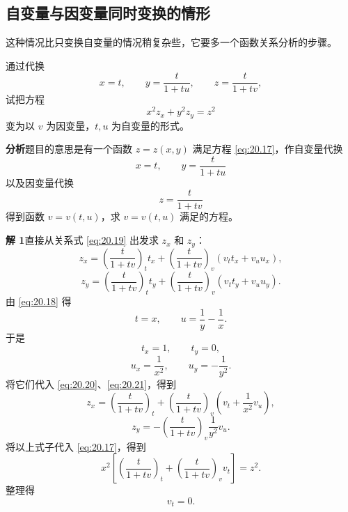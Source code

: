 \subsection{自变量与因变量同时变换的情形}

这种情况比只变换自变量的情况稍复杂些，它要多一个函数关系分析的步骤。

\begin{xexample}[20.3.3]
通过代换
\[
  x=t,\qquad y=\frac{t}{1+tu},\qquad z=\frac{t}{1+tv},
\]
试把方程
\begin{equation}
  x^2z_x+y^2z_y=z^2
  \tag{20.17}
  \label{eq:20.17}
\end{equation}
变为以 $v$ 为因变量，$t,u$ 为自变量的形式。
\end{xexample}
\begin{xsolution}
\textbf{分析}\quad 题目的意思是有一个函数 $z=z(x,y)$ 满足方程 \eqref{eq:20.17}，作自变量代换
\begin{equation}
  x=t,\qquad y=\frac{t}{1+tu}
  \tag{20.18}
  \label{eq:20.18}
\end{equation}
以及因变量代换
\begin{equation}
  z=\frac{t}{1+tv}
  \tag{20.19}
  \label{eq:20.19}
\end{equation}
得到函数 $v=v(t,u)$，求 $v=v(t,u)$ 满足的方程。

\textbf{解 1}\quad 直接从关系式 \eqref{eq:20.19} 出发求 $z_x$ 和 $z_y$：
\begin{equation}
  z_x=\left(\frac{t}{1+tv}\right)_t t_x
  +\left(\frac{t}{1+tv}\right)_v(v_tt_x+v_uu_x),
  \tag{20.20}
  \label{eq:20.20}
\end{equation}
\begin{equation}
  z_y=\left(\frac{t}{1+tv}\right)_t t_y
  +\left(\frac{t}{1+tv}\right)_v(v_tt_y+v_uu_y).
  \tag{20.21}
  \label{eq:20.21}
\end{equation}
由 \eqref{eq:20.18} 得
\[
  t=x,\qquad u=\frac1y-\frac1x.
\]
于是
\[
  t_x=1,\qquad t_y=0,
\]
\[
  u_x=\frac1{x^2},\qquad u_y=-\frac1{y^2}.
\]
将它们代入 \eqref{eq:20.20}、\eqref{eq:20.21}，得到
\[
  z_x=\left(\frac{t}{1+tv}\right)_t
  +\left(\frac{t}{1+tv}\right)_v
  \left(v_t+\frac1{x^2}v_u\right),
\]
\[
  z_y=-\left(\frac{t}{1+tv}\right)_v\frac1{y^2}v_u.
\]
将以上式子代入 \eqref{eq:20.17}，得到
\[
  x^2\left[\left(\frac{t}{1+tv}\right)_t
  +\left(\frac{t}{1+tv}\right)_vv_t\right]=z^2.
\]
整理得
\[
  v_t=0.
\]


\end{xsolution}
